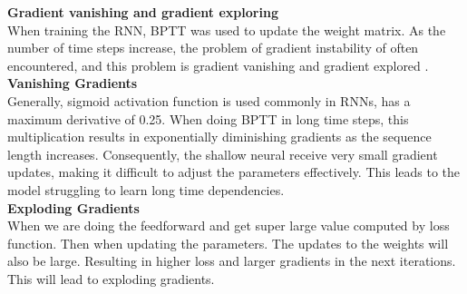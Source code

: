 \documentclass[12pt,a4paper]{article}
\begin{document}
\newpage
\textbf{Gradient vanishing and gradient exploring}
\\[1ex]
When training the RNN, BPTT was used to update the weight matrix. As the number of time steps increase, the problem of gradient instability of often encountered, and this problem is gradient vanishing and gradient explored \parencite{bengio1994learning}. 
\\[2ex]
\textbf{Vanishing Gradients}
\\[1ex]
Generally, sigmoid activation function is used commonly in RNNs, has a maximum derivative of 0.25. When doing BPTT in long time steps, this multiplication results in exponentially diminishing gradients as the sequence length increases. Consequently, the shallow neural receive very small gradient updates, making it difficult to adjust the parameters effectively. This leads to the model struggling to learn long time dependencies. 
\\[2ex]
\textbf{Exploding Gradients}
\\[1ex]
When we are doing the feedforward and get super large value computed by loss function. Then when updating the parameters. The updates to the weights will also be large. Resulting in higher loss and larger gradients in the next iterations. This will lead to exploding gradients.
\end{document}
